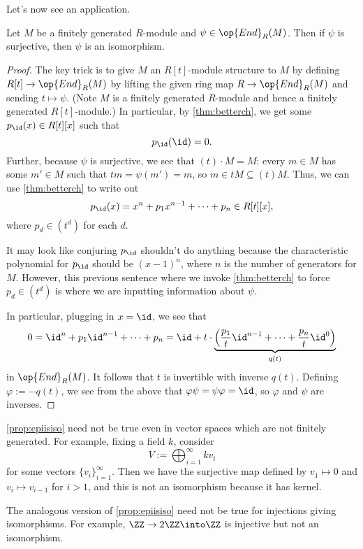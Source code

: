 Let's now see an application.
\begin{proposition} \label{prop:epiisiso}
	Let $M$ be a finitely generated $R$-module and $\psi\in\op{End}_R(M)$. Then if $\psi$ is surjective, then $\psi$ is an isomorphism.
\end{proposition}
\begin{proof}
	The key trick is to give $M$ an $R[t]$-module structure to $M$ by defining $R[t]\to\op{End}_R(M)$ by lifting the given ring map $R\to\op{End}_R(M)$ and sending $t\mapsto\psi$. (Note $M$ is a finitely generated $R$-module and hence a finitely generated $R[t]$-module.) In particular, by \autoref{thm:betterch}, we get some $p_{\id}(x)\in R[t][x]$ such that
	\[p_{\id}({\id})=0.\]
	Further, because $\psi$ is surjective, we see that $(t)\cdot M=M$: every $m\in M$ has some $m'\in M$ such that $tm=\psi(m')=m$, so $m\in tM\subseteq(t)M$. Thus, we can use \autoref{thm:betterch} to write out
	\[p_{\id}(x)=x^n+p_1x^{n-1}+\cdots+p_n\in R[t][x],\]
	where $p_d\in\left(t^d\right)$ for each $d$.
	\begin{remark}[Nir]
		It may look like conjuring $p_{\id}$ shouldn't do anything because the characteristic polynomial for $p_{\id}$ should be $(x-1)^n$, where $n$ is the number of generators for $M$. However, this previous sentence where we invoke \autoref{thm:betterch} to force $p_d\in\left(t^d\right)$ is where we are inputting information about $\psi$.
	\end{remark}
	In particular, plugging in $x=\id$, we see that
	\[0={\id}^n+p_1{\id}^{n-1}+\cdots+p_n={\id}+t\cdot\underbrace{\left(\frac{p_1}t{\id}^{n-1}+\cdots+\frac{p_n}t{\id}^0\right)}_{q(t)}\]
	in $\op{End}_R(M)$. It follows that $t$ is invertible with inverse $q(t)$. Defining $\varphi:=-q(t)$, we see from the above that $\varphi\psi=\psi\varphi=\id$, so $\varphi$ and $\psi$ are inverses.
\end{proof}
\begin{remark}
	\autoref{prop:epiisiso} need not be true even in vector spaces which are not finitely generated. For example, fixing a field $k$, consider
	\[V:=\bigoplus_{i=1}^\infty kv_i\]
	for some vectors $\{v_i\}_{i=1}^\infty$. Then we have the surjective map defined by $v_1\mapsto0$ and $v_i\mapsto v_{i-1}$ for $i>1$, and this is not an isomorphism because it has kernel.
\end{remark}
\begin{remark}
	The analogous version of \autoref{prop:epiisiso} need not be true for injections giving isomorphisms. For example, $\ZZ\to2\ZZ\into\ZZ$ is injective but not an isomorphism.
\end{remark}
